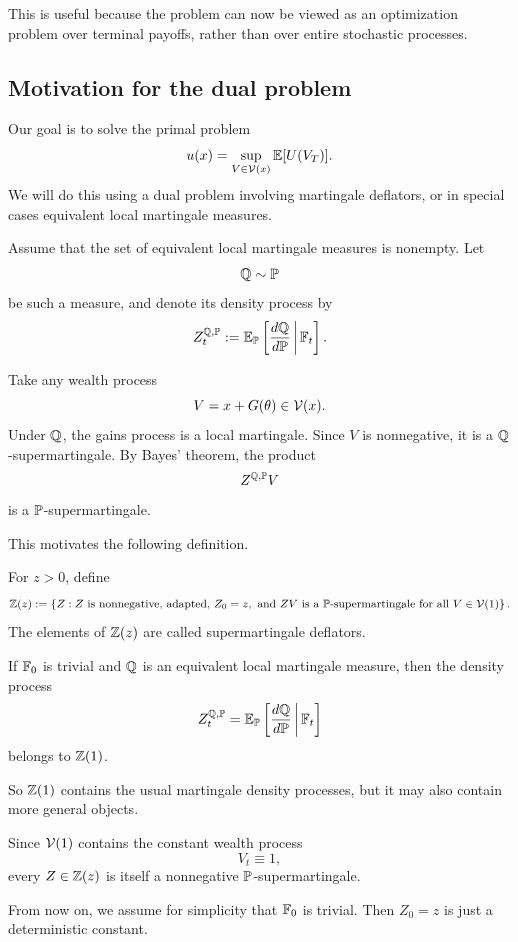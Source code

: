 \begin{opomba}
This is useful because the problem can now be viewed as an optimization problem over terminal payoffs, rather than over entire stochastic processes.
\end{opomba}

\subsection{Motivation for the dual problem}

Our goal is to solve the primal problem
\[
    u(x)=\sup_{V\in\mathcal{V}(x)}\mathbb{E}[U(V_T)].
\]
We will do this using a dual problem involving martingale deflators, or in special cases equivalent local martingale measures.

Assume that the set of equivalent local martingale measures is nonempty. Let
\[
    \mathbb{Q}\sim\mathbb{P}
\]
be such a measure, and denote its density process by
\[
    Z_t^{\mathbb{Q},\mathbb{P}}
    :=
    \mathbb{E}_{\mathbb{P}}\left[\frac{d\mathbb{Q}}{d\mathbb{P}}\,\middle|\,\mathbb{F}_t\right].
\]

Take any wealth process
\[
    V=x+G(\theta)\in\mathcal{V}(x).
\]
Under $\mathbb{Q}$, the gains process is a local martingale. Since $V$ is nonnegative, it is a $\mathbb{Q}$-supermartingale. By Bayes' theorem, the product
\[
    Z^{\mathbb{Q},\mathbb{P}}V
\]
is a $\mathbb{P}$-supermartingale.

This motivates the following definition.

\begin{definicija}
For $z>0$, define
\[
    \mathbb{Z}(z)
    :=
    \left\{
        Z:
        Z \text{ is nonnegative, adapted, } Z_0=z,
        \text{ and } ZV \text{ is a } \mathbb{P}\text{-supermartingale for all } V\in\mathcal{V}(1)
    \right\}.
\]
The elements of $\mathbb{Z}(z)$ are called supermartingale deflators.
\end{definicija}

\begin{primer}
If $\mathbb{F}_0$ is trivial and $\mathbb{Q}$ is an equivalent local martingale measure, then the density process
\[
    Z_t^{\mathbb{Q},\mathbb{P}}
    =
    \mathbb{E}_{\mathbb{P}}\left[\frac{d\mathbb{Q}}{d\mathbb{P}}\,\middle|\,\mathbb{F}_t\right]
\]
belongs to $\mathbb{Z}(1)$.

So $\mathbb{Z}(1)$ contains the usual martingale density processes, but it may also contain more general objects.
\end{primer}

\begin{opomba}
Since $\mathcal{V}(1)$ contains the constant wealth process
\[
    V_t\equiv 1,
\]
every $Z\in\mathbb{Z}(z)$ is itself a nonnegative $\mathbb{P}$-supermartingale.

From now on, we assume for simplicity that $\mathbb{F}_0$ is trivial. Then $Z_0=z$ is just a deterministic constant.
\end{opomba}

